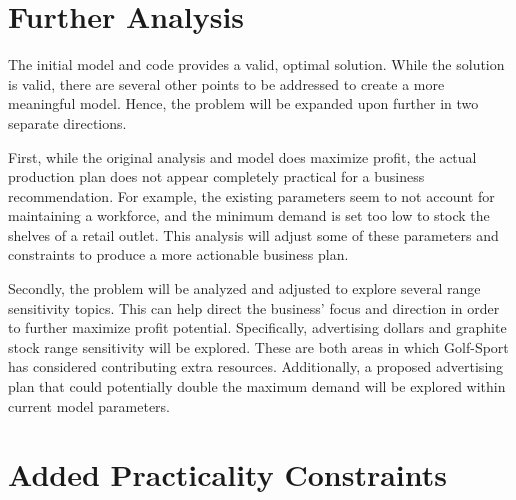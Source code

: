 \documentclass{article}
\begin{document}
\section{Further Analysis}
The initial model and code provides a valid, optimal solution.  While the solution is valid, there are several other points to be addressed to create a more meaningful model.  Hence, the problem will be expanded upon further in two separate directions.
\par
First, while the original analysis and model does maximize profit, the actual production plan does not appear completely practical for a business recommendation.  For example, the existing parameters seem to not account for maintaining a workforce, and the minimum demand is set too low to stock the shelves of a retail outlet.  This analysis will adjust some of these parameters and constraints to produce a more 
actionable business plan.
\par
Secondly, the problem will be analyzed and adjusted to explore several range sensitivity topics.  This can help direct the business' focus and direction in order to further maximize profit potential.  Specifically, advertising dollars and graphite stock range sensitivity will be explored.  These are both areas in which Golf-Sport has considered contributing extra resources.  Additionally, a proposed advertising plan 
that could potentially double the maximum demand will be explored within current model parameters.
\section{Added Practicality Constraints}
\end{document}
